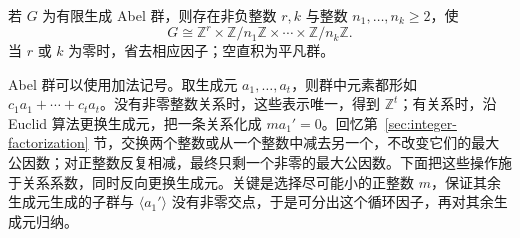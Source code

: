 \documentclass[lang=cn,a4paper,fontset=none,zihao=false,10pt,openany,twoside]{beautybook}
\numberwithin{algorithm}{chapter}
\begin{document}
\begin{theorem}\label{thm:fg-abelian-decomposition}
\setlength{\emergencystretch}{1em}%
若 $G$ 为有限生成 Abel 群，则存在非负整数 $r,k$ 与整数 $n_1,\ldots,n_k\ge2$，使
\[
 G\cong\mathbb Z^r\times\mathbb Z/n_1\mathbb Z\times\cdots\times\mathbb Z/n_k\mathbb Z.
\]
当 $r$ 或 $k$ 为零时，省去相应因子；空直积为平凡群。
\end{theorem}
\begin{remark}[由整数关系分出一个循环因子]
Abel 群可以使用加法记号。取生成元 $a_1,\ldots,a_t$，则群中元素都形如 $c_1a_1+\cdots+c_ta_t$。没有非零整数关系时，这些表示唯一，得到 $\mathbb Z^t$；有关系时，沿 Euclid 算法更换生成元，把一条关系化成 $ma_1'=0$。回忆第~\ref{sec:integer-factorization} 节，交换两个整数或从一个整数中减去另一个，不改变它们的最大公因数；对正整数反复相减，最终只剩一个非零的最大公因数。下面把这些操作施于关系系数，同时反向更换生成元。关键是选择尽可能小的正整数 $m$，保证其余生成元生成的子群与 $\langle a_1'\rangle$ 没有非零交点，于是可分出这个循环因子，再对其余生成元归纳。
\end{remark}
\end{document}
